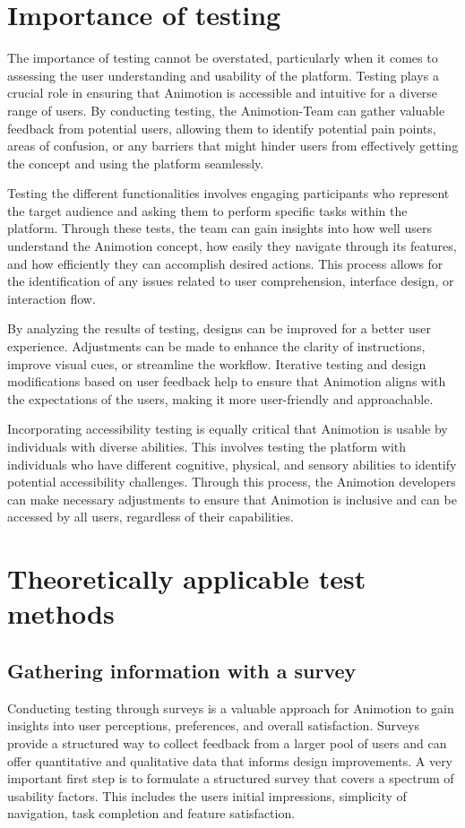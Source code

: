 \section{Importance of testing}
The importance of testing cannot be overstated, particularly when it comes to 
assessing the user understanding and usability of the platform. Testing plays a crucial role in ensuring 
that Animotion is accessible and intuitive for a diverse range of users. By conducting testing, 
the Animotion-Team can gather valuable feedback from potential users, allowing them to identify 
potential pain points, areas of confusion, or any barriers that might hinder users from effectively getting 
the concept and using the platform seamlessly.

Testing the different functionalities involves engaging participants who represent the target audience and asking them to perform
specific tasks within the platform. Through these tests, the team can gain insights into how well users understand 
the Animotion concept, how easily they navigate through its features, and how efficiently they can accomplish desired 
actions. This process allows for the identification of any issues related to user comprehension, interface design, or 
interaction flow.

By analyzing the results of testing, designs can be improved for a better user experience. 
Adjustments can be made to enhance the clarity of instructions, improve visual cues, or streamline the workflow. Iterative 
testing and design modifications based on user feedback help to ensure that Animotion aligns with the expectations of the users, making 
it more user-friendly and approachable.

Incorporating accessibility testing is equally critical that Animotion is usable by individuals with diverse 
abilities. This involves testing the platform with individuals who have different cognitive, physical, and sensory abilities 
to identify potential accessibility challenges. Through this process, the Animotion developers can make necessary adjustments to ensure 
that Animotion is inclusive and can be accessed by all users, regardless of their capabilities.

\section{Theoretically applicable test methods}

\subsection{Gathering information with a survey}
Conducting testing through surveys is a valuable approach for Animotion to gain insights into user perceptions, 
preferences, and overall satisfaction. Surveys provide a structured way to collect feedback from a larger pool of users and 
can offer quantitative and qualitative data that informs design improvements.
A very important first step is to formulate a structured survey that covers a spectrum of usability factors. 
This includes the users initial impressions, simplicity of navigation, task completion and feature satisfaction.

